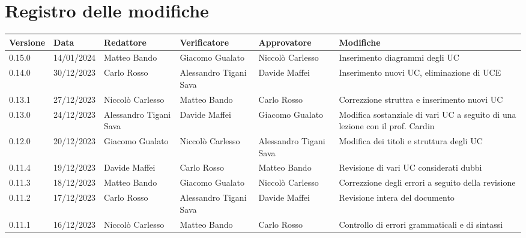 \section*{Registro delle modifiche}


\begin{table}[H]
	\centering
	\fontsize{10}{12}\selectfont
	\begin{tabularx}{\textwidth}{X|X|X|X|X|X}
		\textbf{Versione}     & \textbf{Data}        & \textbf{Redattore}     &
		\textbf{Verificatore} & \textbf{Approvatore} & \textbf{Modifiche}                                                                                                                    \\
		\toprule
		0.15.0	              & 14/01/2024            & Matteo Bando           & Giacomo Gualato        & Niccolò Carlesso            & Inserimento diagrammi degli UC                                     \\
		\hline
		0.14.0	              & 30/12/2023            & Carlo Rosso            & Alessandro Tigani Sava & Davide Maffei            & Inserimento nuovi UC, eliminazione di UCE                                     \\
		\hline
		0.13.1	              & 27/12/2023           & Niccolò Carlesso       & Matteo Bando           & Carlo Rosso            & Correzzione struttra e inserimento nuovi UC                                     \\
		\hline
		0.13.0	              & 24/12/2023           & Alessandro Tigani Sava & Davide Maffei          & Giacomo Gualato        & Modifica sostanziale di vari UC a seguito di una lezione con il prof. Cardin                                     \\
		\hline
		0.12.0	              & 20/12/2023           & Giacomo Gualato        & Niccolò Carlesso       & Alessandro Tigani Sava & Modifica dei titoli e struttura degli UC                                     \\
		\hline
		0.11.4	              & 19/12/2023           & Davide Maffei          & Carlo Rosso            & Matteo Bando           & Revisione di vari UC considerati dubbi                                     \\
		\hline
		0.11.3                & 18/12/2023           & Matteo Bando           & Giacomo Gualato        & Niccolò Carlesso       & Correzzione degli errori a seguito della revisione                                     \\
		\hline
		0.11.2                & 17/12/2023           & Carlo Rosso            & Alessandro Tigani Sava & Davide Maffei          & Revisione intera del documento                                     \\
		\hline
		0.11.1                & 16/12/2023           & Niccolò Carlesso       & Matteo Bando           & Carlo Rosso            & Controllo di errori grammaticali e di sintassi                                     \\
		\bottomrule
	\end{tabularx}
\end{table}



